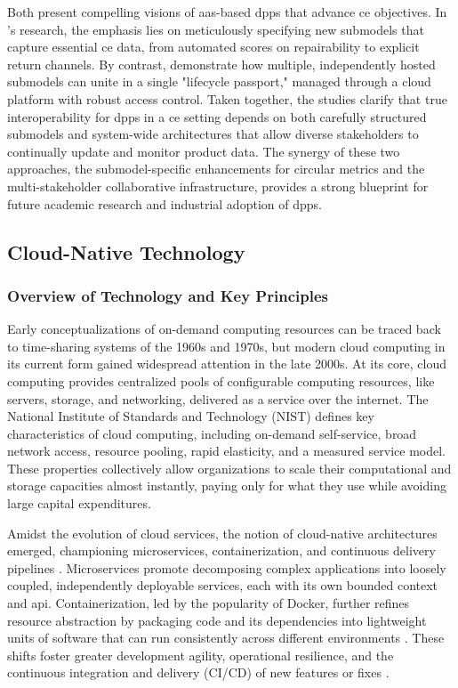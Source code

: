 Both \textcite{Kuhn.2025, Pourjafarian.2023} present compelling visions of \ac{aas}-based \ac{dpp}s that advance \acrlong{ce} objectives. In \textcite{Kuhn.2025}'s research, the emphasis lies on meticulously specifying new submodels that capture essential \ac{ce} data, from automated scores on repairability to explicit return channels. By contrast, \textcite{Pourjafarian.2023} demonstrate how multiple, independently hosted submodels can unite in a single "lifecycle passport," managed through a cloud platform with robust access control. Taken together, the studies clarify that true interoperability for \ac{dpp}s in a \ac{ce} setting depends on both carefully structured submodels and system-wide architectures that allow diverse stakeholders to continually update and monitor product data. The synergy of these two approaches, the submodel-specific enhancements for circular metrics and the multi-stakeholder collaborative infrastructure, provides a strong blueprint for future academic research and industrial adoption of \ac{dpp}s. \autocite{Pourjafarian.2023, Kuhn.2025}

\subsection{Cloud-Native Technology}

\subsubsection*{Overview of Technology and Key Principles}
Early conceptualizations of on-demand computing resources can be traced back to time-sharing systems of the 1960s and 1970s, but modern cloud computing in its current form gained widespread attention in the late 2000s. At its core, cloud computing provides centralized pools of configurable computing resources, like servers, storage, and networking, delivered as a service over the internet. The National Institute of Standards and Technology (NIST) defines key characteristics of cloud computing, including on-demand self-service, broad network access, resource pooling, rapid elasticity, and a measured service model. These properties collectively allow organizations to scale their computational and storage capacities almost instantly, paying only for what they use while avoiding large capital expenditures. \autocite{Armbrust.2010, Mell.2011}

Amidst the evolution of cloud services, the notion of cloud-native architectures emerged, championing microservices, containerization, and continuous delivery pipelines \autocite{Dragoni.2017, Balalaie.2016}. Microservices promote decomposing complex applications into loosely coupled, independently deployable services, each with its own bounded context and \ac{api}. Containerization, led by the popularity of Docker, further refines resource abstraction by packaging code and its dependencies into lightweight units of software that can run consistently across different environments \autocite{Merkel.2014}. These shifts foster greater development agility, operational resilience, and the continuous integration and delivery (CI/CD) of new features or fixes \autocite{Fowler.2015}.

